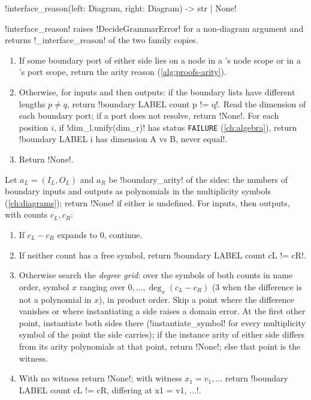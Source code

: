 \begin{signature}
\py!interface_reason(left: Diagram, right: Diagram) -> str | None!
\end{signature}
\py!interface_reason! raises \py!DecideGrammarError! for a non-diagram argument and returns \py!_interface_reason! of the two family copies.

\begin{algorithm}\label{alg:proofs-interface}
\leavevmode
\begin{enumerate}
\item If some boundary port of either side lies on a node in a \bbox's node scope or in a \bbox's port scope, return the arity reason (\cref{alg:proofs-arity}).
\item Otherwise, for inputs and then outputs: if the boundary lists have different lengths $p\neq q$, return \code!boundary LABEL count p != q!. Read the dimension of each boundary port; if a port does not resolve, return \py!None!. For each position $i$, if \py!dim_l.unify(dim_r)! has status \texttt{FAILURE} (\cref{ch:algebra}), return \code!boundary LABEL i has dimension A vs B, never equal!.
\item Return \py!None!.
\end{enumerate}
\end{algorithm}

\begin{algorithm}\label{alg:proofs-arity}
Let $a_L=(I_L,O_L)$ and $a_R$ be \py!boundary_arity! of the sides: the numbers of boundary inputs and outputs as polynomials in the multiplicity symbols (\cref{ch:diagrams}); return \py!None! if either is undefined. For inputs, then outputs, with counts $c_L,c_R$:
\begin{enumerate}
\item If $c_L-c_R$ expands to $0$, continue.
\item If neither count has a free symbol, return \code!boundary LABEL count cL != cR!.
\item Otherwise search the \emph{degree grid}: over the symbols of both counts in name order, symbol $x$ ranging over $0,\ldots,\deg_x(c_L-c_R)$ ($3$ when the difference is not a polynomial in $x$), in product order. Skip a point where the difference vanishes or where instantiating a side raises a domain error. At the first other point, instantiate both sides there (\py!instantiate_symbol! for every multiplicity symbol of the point the side carries); if the instance arity of either side differs from its arity polynomials at that point, return \py!None!; else that point is the witness.
\item With no witness return \py!None!; with witness $x_1=v_1,\ldots$ return \code!boundary LABEL count cL != cR, differing at x1 = v1, ...!.
\end{enumerate}
\end{algorithm}

